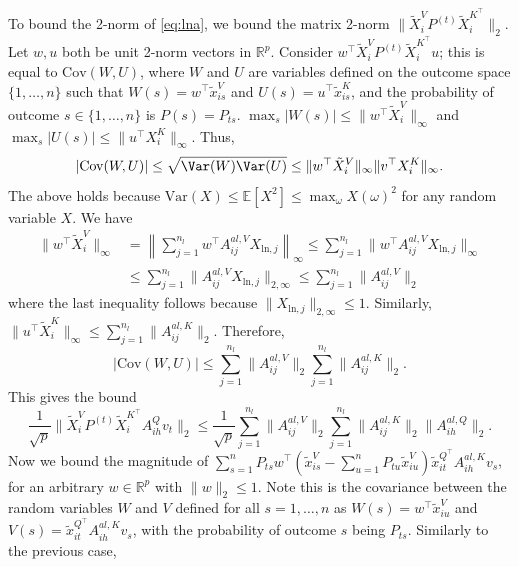 \documentclass{article}
\begin{document}
To bound the 2-norm of \eqref{eq:lna}, we bound the matrix 2-norm $\|\tilde X_i^V P^{(t)} \tilde X_i^{K^\top}\|_2$. Let $w, u$ both be unit 2-norm
vectors in $\mathbb R^p$. Consider $w^\top \tilde X_i^V P^{(t)} \tilde X_i^{K^\top} u$; this is equal to $\mathrm{Cov}(W, U)$, where 
$W$ and $U$ are variables defined on the outcome space $\{1,\ldots, n\}$ such that $W(s) = w^\top \tilde x^V_{is}$ and $U(s) = 
u^\top \tilde x^{K}_{is}$, and the probability of outcome $s\in\{1,\ldots, n\}$ is $P(s) = P_{ts}$.
$\max_s |W(s)| \leq \|w^\top \tilde X_i^V\|_\infty$ and $\max_s |U(s)| \leq \|u^\top X_i^K\|_\infty$. Thus, 
\begin{equation*}
  |\mathrm{Cov}(W, U)| \leq \sqrt{\Var(W)\Var(U)} \leq \|w^\top \tilde X_i^V\|_\infty \|v^\top X_i^K\|_\infty.
\end{equation*}
The above holds because $\mathrm{Var}(X) \leq \mathbb E [X^2] \leq \max_{\omega} X(\omega)^2$ for any random variable $X$.
We have 
\begin{align*}
\|w^\top \tilde X_i^V\|_\infty &= \left\|\sum_{j=1}^{n_l} w^\top A^{al, V}_{ij} X_{\text{ln},j}\right\|_\infty
\leq \sum_{j=1}^{n_l} \|w^\top A^{al, V}_{ij} X_{\text{ln},j}\|_\infty \\
&\leq \sum_{j=1}^{n_l} \|A^{al, V}_{ij} X_{\text{ln},j}\|_{2,\infty} \leq \sum_{j=1}^{n_l} \|A_{ij}^{al, V}\|_2
\end{align*}
where the last inequality follows because $\|X_{\text{ln},j}\|_{2,\infty}\leq 1$. Similarly, $\|u^\top \tilde X_i^K\|_\infty
\leq \sum_{j=1}^{n_l} \|A^{al, K}_{ij}\|_2$. Therefore,
\begin{equation*}
  |\mathrm{Cov}(W, U)| \leq \sum_{j=1}^{n_l} \|A^{al, V}_{ij}\|_2 \sum_{j=1}^{n_l} \|A^{al, K}_{ij}\|_2.
\end{equation*}
This gives the bound
\begin{equation*}
  \frac1{\sqrt p} \|\tilde X_i^V P^{(t)} \tilde X_i^{K^\top} A_{ih}^Q v_t \|_2 \leq \frac1{\sqrt p} 
  \sum_{j=1}^{n_l} \|A^{al, V}_{ij}\|_2 \sum_{j=1}^{n_l} \|A^{al, K}_{ij}\|_2 \|A^{al, Q}_{ih}\|_2.
\end{equation*}
Now we bound the magnitude of $\sum_{s=1}^n P_{ts}w^\top(\tilde x^V_{is} - \sum_{u=1}^n P_{tu} \tilde x^V_{iu})
\tilde x_{it}^{Q^\top}A^{al, K}_{ih} v_s$, for an arbitrary $w\in\mathbb R^p$ with $\|w\|_2\leq 1$.
Note this is the covariance between the random variables $W$ and $V$ defined for all $s=1,\ldots, n$ as 
$W(s) = w^\top \tilde x^V_{iu}$ and $V(s) = \tilde x_{it}^{Q^\top} A_{ih}^{al, K}v_s$, with the probability
of outcome $s$ being $P_{ts}$. Similarly to the previous case,
\end{document}
